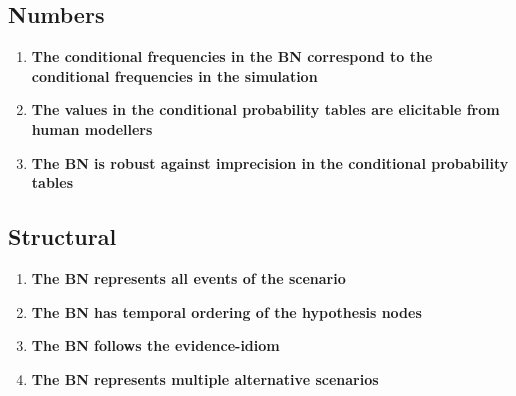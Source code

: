 \subsection{Numbers}
\begin{enumerate}
\item \textbf{The conditional frequencies in the BN correspond to the conditional frequencies in the simulation}
\item \textbf{The values in the conditional probability tables are elicitable from human modellers}
\item \textbf{The BN is robust against imprecision in the conditional probability tables}
\end{enumerate}

\subsection{Structural}

\begin{enumerate}
\item \textbf{The BN represents all events of the scenario}
\item \textbf{The BN has temporal ordering of the hypothesis nodes}
\item \textbf{The BN follows the evidence-idiom}
\item \textbf{The BN represents multiple alternative scenarios}

\end{enumerate}

